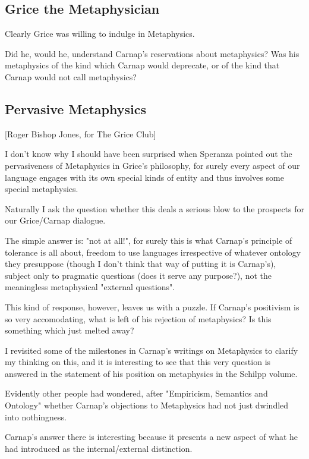 \documentclass[10pt,titlepage]{book}
\begin{document}
\subsection{Grice the Metaphysician}

Clearly Grice was willing to indulge in Metaphysics.

Did he, would he, understand Carnap's reservations about metaphysics?
Was his metaphysics of the kind which Carnap would deprecate, or of the kind that Carnap would not call metaphysics?

\subsection{Pervasive Metaphysics}

[Roger Bishop Jones, for The Grice Club]

I don't know why I should have been surprised when Speranza pointed out the pervasiveness of Metaphysics in Grice's philosophy, for surely every aspect of our language engages with its own special kinds of entity and thus involves some special metaphysics.

Naturally I ask the question whether this deals a serious blow to the prospects for our Grice/Carnap dialogue.

The simple answer is: "not at all!", for surely this is what Carnap's principle of tolerance is all about, freedom to use languages irrespective of whatever ontology they presuppose (though I don't think that way of putting it is Carnap's), subject only to pragmatic questions (does it serve any purpose?), not the meaningless metaphysical "external questions".

This kind of response, however, leaves us with a puzzle.  If Carnap's positivism is so very accomodating, what is left of his rejection of metaphysics?  Is this something which just melted away?

I revisited some of the milestones in Carnap's writings on Metaphysics to clarify my thinking on this, and it is interesting to see that this very question is answered in the statement of his position on metaphysics in the Schilpp volume\cite{carnap63a}.

Evidently other people had wondered, after "Empiricism, Semantics and Ontology" whether Carnap's objections to Metaphysics had not just dwindled into nothingness.

Carnap's answer there is interesting because it presents a new aspect of what he had introduced as the internal/external distinction.
\end{document}
